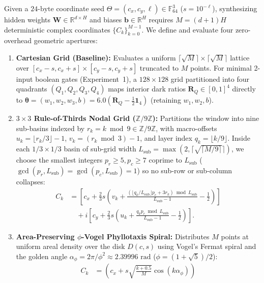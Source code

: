 Given a $24\text{-byte}$ coordinate seed $\Theta = (c_x, c_y, \ell) \in \mathbb{F}_{64}^3$ ($s = 10^{-\ell}$), synthesizing hidden weights $\mathbf{W}\in\mathbb{R}^{d\times H}$ and biases $\mathbf{b}\in\mathbb{R}^H$ requires $M = (d+1)H$ deterministic complex coordinates $\{C_k\}_{k=0}^{M-1}$. We define and evaluate four zero-overhead geometric apertures:

\begin{enumerate}
    \item \textbf{Cartesian Grid (Baseline):} Evaluates a uniform $\lceil\sqrt{M}\rceil\times\lceil\sqrt{M}\rceil$ lattice over $[c_x-s, c_x+s]\times[c_y-s, c_y+s]$ truncated to $M$ points. For minimal 2-input boolean gates (Experiment~1), a $128\times 128$ grid partitioned into four quadrants $(Q_1,Q_2,Q_3,Q_4)$ maps interior dark ratios $\mathbf{R}_Q \in [0,1]^4$ directly to $\boldsymbol{\theta} = (w_1,w_2,w_3,b) = 6.0(\mathbf{R}_Q - \tfrac{1}{2}\mathbf{1}_4)$ (retaining $w_1,w_2,b$).
    \item \textbf{$3\times 3$ Rule-of-Thirds Nodal Grid ($\mathbb{Z}/9\mathbb{Z}$):} Partitions the window into nine sub-basins indexed by $r_k = k \bmod 9 \in \mathbb{Z}/9\mathbb{Z}$, with macro-offsets $u_k = \lfloor r_k/3\rfloor - 1$, $v_k = (r_k \bmod 3) - 1$, and layer index $q_k = \lfloor k/9\rfloor$. Inside each $1/3\times 1/3$ basin of sub-grid width $L_{\mathrm{sub}} = \max(2, \lceil\sqrt{\lceil M/9\rceil}\rceil)$, we choose the smallest integers $p_r \ge 5, p_c \ge 7$ coprime to $L_{\mathrm{sub}}$ ($\gcd(p_r,L_{\mathrm{sub}})=\gcd(p_c,L_{\mathrm{sub}})=1$) so no sub-row or sub-column collapses:
    \begin{align}
    \label{eq:rot}
    C_k &= \left[c_x + \tfrac{2}{3}s\!\left(v_k + \tfrac{(\lfloor q_k/L_{\mathrm{sub}}\rfloor p_c + 3r_k) \bmod L_{\mathrm{sub}}}{L_{\mathrm{sub}}-1} - \tfrac{1}{2}\right)\right] \nonumber\\
        &\quad + i\left[c_y + \tfrac{2}{3}s\!\left(u_k + \tfrac{q_k p_r \bmod L_{\mathrm{sub}}}{L_{\mathrm{sub}}-1} - \tfrac{1}{2}\right)\right].
    \end{align}
    \item \textbf{Area-Preserving $\phi$-Vogel Phyllotaxis Spiral:} Distributes $M$ points at uniform areal density over the disk $D(c, s)$ using Vogel's Fermat spiral \cite{vogel1979better} and the golden angle $\alpha_\phi = 2\pi/\phi^2 \approx 2.39996\text{ rad}$ ($\phi=(1+\sqrt{5})/2$):
    \begin{align}
    \label{eq:spiral}
    C_k &= \left(c_x + s\sqrt{\frac{k+0.5}{M}}\cos(k\alpha_\phi)\right) \nonumber\\

\end{align}
\end{enumerate}
